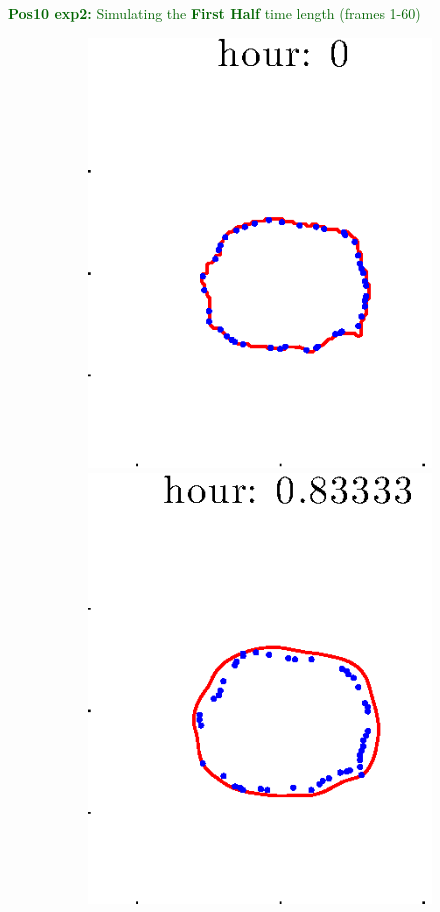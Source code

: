\documentclass[12pt]{article}
\begin{document}
\clearpage

\noindent \textcolor{DarkGreen}{\textbf{Pos10 exp2:} Simulating the \textbf{First Half} time length (frames 1-60)}

\begin{figure}[h!]
\centering
	\begin{subfigure}[b]{.3\textwidth}
	\centering
		\includegraphics[height=.15\textheight]{Pos10exp2/firsthalf/full1.eps}
		\includegraphics[height=.15\textheight]{Pos10exp2/firsthalf/full2.eps}

\end{subfigure}
\end{figure}
\end{document}
